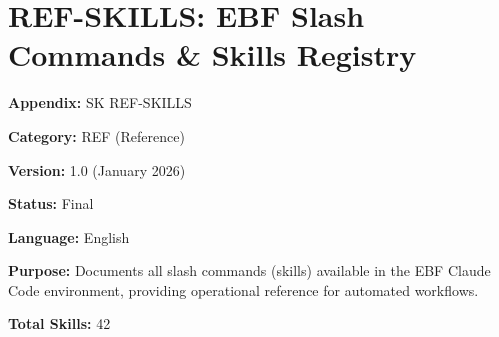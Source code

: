 %
%
%

%
%
%
%
%

\chapter{REF-SKILLS: EBF Slash Commands \& Skills Registry}
\label{app:ref-skills}



\begin{tcolorbox}[colback=blue!5!white, colframe=blue!75!black,
    title=Appendix Metadata]

\textbf{Appendix:} SK REF-SKILLS

\textbf{Category:} REF (Reference)

\textbf{Version:} 1.0 (January 2026)

\textbf{Status:} Final

\textbf{Language:} English

\textbf{Purpose:} Documents all slash commands (skills) available in the EBF Claude Code environment, providing operational reference for automated workflows.

\textbf{Total Skills:} 42

\end{tcolorbox}


